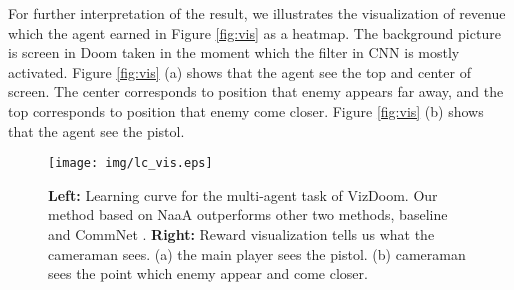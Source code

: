 For further interpretation of the result, 
we illustrates the visualization of revenue which the agent earned in Figure \ref{fig:vis} as a heatmap.
The background picture is screen in Doom taken in the moment which the filter in CNN is mostly activated.
Figure \ref{fig:vis} (a) shows that the agent see the top and center of screen.
The center corresponds to position that enemy appears far away, 
and the top corresponds to position that enemy come closer.
Figure \ref{fig:vis} (b) shows that the agent see the pistol.

%
\begin{figure*}[t]
\centering
\texttt{[image: img/lc\_vis.eps]}
\caption{
	\textbf{Left:}
		Learning curve for the multi-agent task of VizDoom.  
		Our method based on NaaA outperforms other two methods, baseline and CommNet \citep{sukhbaatar2016learning}.
	\textbf{Right:} 
		Reward visualization tells us what the cameraman sees. 
		(a) the main player sees the pistol.
		(b) cameraman sees the point which enemy appear and come closer.
}
\label{fig:double}
\end{figure*}


